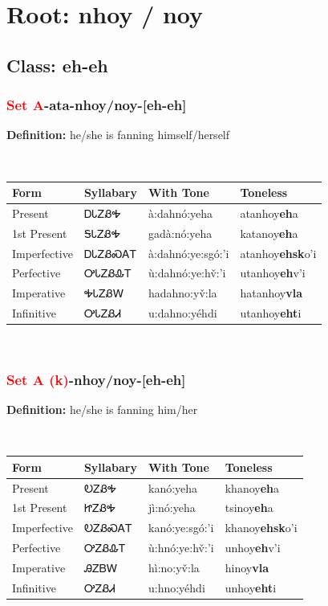 \needspace{4in}
\section*{Root: nhoy / noy}
\nopagebreak
{}
\needspace{3in}
\subsection*{Class: eh-eh}
\nopagebreak
\needspace{2in}
\subsubsection*{\textcolor{Red}{Set A}{-}ata{-}\textbf{nhoy/noy}{-}[eh-eh]}
\nopagebreak
\textbf{Definition: } he/she is fanning himself/herself
\\[0.5em]
\begin{tabularx}{\textwidth}{l X X X}%
\toprule%
\textbf{Form}&\textbf{Syllabary}&\textbf{With Tone}&\textbf{Toneless}\\%
\midrule%
Present&ᎠᏓᏃᏰᎭ&à:dahnó:yeha&atanhoy\textbf{eh}a\\%
1st Present&ᎦᏓᏃᏰᎭ&gadà:nó:yeha&katanoy\textbf{eh}a\\%
Imperfective&ᎠᏓᏃᏰᏍᎪᎢ&à:dahnó:ye:sgó:’i&atanhoy\textbf{ehsk}o'i\\%
Perfective&ᎤᏓᏃᏰᎲᎢ&ù:dahnó:ye:hv̌:’i&utanhoy\textbf{eh}v'i\\%
Imperative&ᎭᏓᏃᏰᎳ&hadahno:yv̌:la&hatanhoy\textbf{vla}\\%
Infinitive&ᎤᏓᏃᏰᏗ&u:dahno:yéhdi&utanhoy\textbf{eht}i\\%
\bottomrule%
\end{tabularx}
\\[1em]
\needspace{2in}
\subsubsection*{\textcolor{Red}{Set A (k)}{-}\textbf{nhoy/noy}{-}[eh-eh]}
\nopagebreak
\textbf{Definition: } he/she is fanning him/her
\\[0.5em]
\begin{tabularx}{\textwidth}{l X X X}%
\toprule%
\textbf{Form}&\textbf{Syllabary}&\textbf{With Tone}&\textbf{Toneless}\\%
\midrule%
Present&ᎧᏃᏰᎭ&kanó:yeha&khanoy\textbf{eh}a\\%
1st Present&ᏥᏃᏰᎭ&jì:nó:yeha&tsinoy\textbf{eh}a\\%
Imperfective&ᎧᏃᏰᏍᎪᎢ&kanó:ye:sgó:’i&khanoy\textbf{ehsk}o'i\\%
Perfective&ᎤᏃᏰᎲᎢ&ù:hnó:ye:hv̌:’i&unhoy\textbf{eh}v'i\\%
Imperative&ᎯᏃᏴᎳ&hì:no:yv̌:la&hinoy\textbf{vla}\\%
Infinitive&ᎤᏃᏰᏗ&u:hno:yéhdi&unhoy\textbf{eht}i\\%
\bottomrule%
\end{tabularx}
\\[1em]